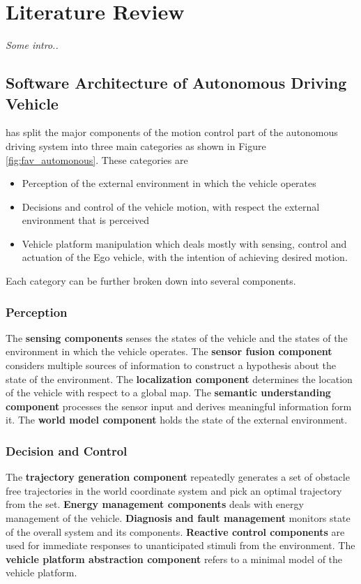 \setlength{\footskip}{8mm}

\chapter{Literature Review} 
\label{ch:literature-review}

\textit{Some intro..}

\section{Software Architecture of Autonomous Driving Vehicle}
\label{section-name-in-literature-review}

 has split the major components of the motion control part of the autonomous driving system into three main categories as shown in Figure \ref{fig:fav_automonous}. These categories are

\begin{itemize}
	\item Perception of the external environment in which the vehicle operates
	\item Decisions and control of the vehicle motion, with respect the external environment that is perceived
	\item Vehicle platform manipulation which deals mostly with sensing, control and actuation of the Ego vehicle, with the intention of achieving desired motion.
\end {itemize}

Each category can be further broken down into several components.

\subsection{Perception}

The \textbf{sensing components} senses the states of the vehicle and the states of the environment in which the vehicle operates. The \textbf{sensor fusion component} considers multiple sources of information to construct a hypothesis about the state of the environment. The \textbf{localization component} determines the location of the vehicle with respect to a global map. The \textbf{semantic understanding component} processes the sensor input and derives meaningful information form it. The \textbf{world model component} holds the state of the external environment.

\subsection{Decision and Control}
The \textbf{trajectory generation component} repeatedly generates a set of obstacle free trajectories in the world coordinate system and pick an optimal trajectory from the set.  \textbf{Energy management components} deals with energy management of the vehicle. \textbf{Diagnosis and fault management} monitors state of the overall system and its components. \textbf{Reactive control components} are used for immediate responses to unanticipated stimuli from the environment. The \textbf{vehicle platform abstraction component} refers to a minimal model of the vehicle platform. 

